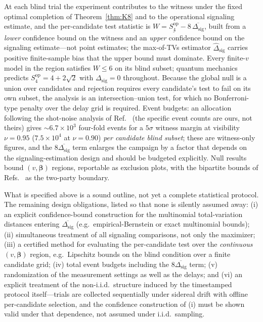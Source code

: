 \documentclass[10pt,twocolumn]{article}
\newcommand{\Dsig}{\Delta_{\mathrm{sig}}}
\begin{document}
At each blind trial the experiment contributes to the witness under the fixed optimal completion of Theorem~\ref{thm:K8} and to the operational signaling estimate, and the per-candidate test statistic is $W = \underline{S_4^{\mathrm{op}}} - 8\,\overline{\Dsig}$, built from a \emph{lower} confidence bound on the witness and an \emph{upper} confidence bound on the signaling estimate---not point estimates; the max-of-TVs estimator $\widehat\Dsig$ carries positive finite-sample bias that the upper bound must dominate. Every finite-$v$ model in the region satisfies $W\le6$ on its blind subset; quantum mechanics predicts $S_4^{\mathrm{op}}=4{+}2\sqrt2$ with $\Dsig=0$ throughout. Because the global null is a union over candidates and rejection requires every candidate's test to fail on its own subset, the analysis is an intersection--union test, for which no Bonferroni-type penalty over the delay grid is required. Event budgets: an allocation following the shot-noise analysis of Ref.~\cite{Li2026} (the specific event counts are ours, not theirs) gives ${\sim}6.7\times10^3$ four-fold events for a $5\sigma$ witness margin at visibility $\nu=0.95$ ($7.5\times10^4$ at $\nu=0.90$) \emph{per candidate blind subset}; these are witness-only figures, and the $8\overline{\Dsig}$ term enlarges the campaign by a factor that depends on the signaling-estimation design and should be budgeted explicitly. Null results bound $(v,\boldsymbol\beta)$ regions, reportable as exclusion plots, with the bipartite bounds of Refs.~\cite{Salart2008,Cocciaro2018,Slussarenko2023} as the two-party boundary.

What is specified above is a sound outline, not yet a complete statistical protocol. The remaining design obligations, listed so that none is silently assumed away: (i) an explicit confidence-bound construction for the multinomial total-variation distances entering $\overline{\Dsig}$ (e.g.\ empirical-Bernstein or exact multinomial bounds); (ii) simultaneous treatment of all signaling comparisons, not only the maximizer; (iii) a certified method for evaluating the per-candidate test over the \emph{continuous} $(v,\boldsymbol\beta)$ region, e.g.\ Lipschitz bounds on the blind condition over a finite candidate grid; (iv) total event budgets including the $8\overline{\Dsig}$ term; (v) randomization of the measurement settings as well as the delays; and (vi) an explicit treatment of the non-i.i.d.\ structure induced by the timestamped protocol itself---trials are collected sequentially under sidereal drift with offline per-candidate selection, and the confidence construction of (i) must be shown valid under that dependence, not assumed under i.i.d.\ sampling.
\end{document}
